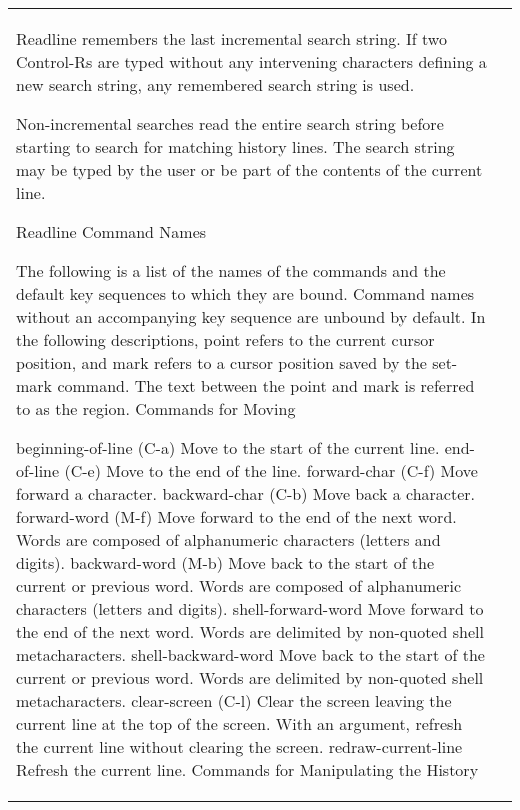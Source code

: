 \documentclass[11pt]{article}
\begin{document}
\begin{longtable}{p{}p{}}
{{{Readline remembers the last incremental search string. If two Control-Rs are typed without any intervening characters defining a new search string, any remembered search string is used.

Non-incremental searches read the entire search string before starting to search for matching history lines. The search string may be typed by the user or be part of the contents of the current line.

Readline Command Names

The following is a list of the names of the commands and the default key sequences to which they are bound. Command names without an accompanying key sequence are unbound by default. In the following descriptions, point refers to the current cursor position, and mark refers to a cursor position saved by the set-mark command. The text between the point and mark is referred to as the region.
Commands for Moving

beginning-of-line (C-a)
Move to the start of the current line.
end-of-line (C-e)
Move to the end of the line.
forward-char (C-f)
Move forward a character.
backward-char (C-b)
Move back a character.
forward-word (M-f)
Move forward to the end of the next word. Words are composed of alphanumeric characters (letters and digits).
backward-word (M-b)
Move back to the start of the current or previous word. Words are composed of alphanumeric characters (letters and digits).
shell-forward-word
Move forward to the end of the next word. Words are delimited by non-quoted shell metacharacters.
shell-backward-word
Move back to the start of the current or previous word. Words are delimited by non-quoted shell metacharacters.
clear-screen (C-l)
Clear the screen leaving the current line at the top of the screen. With an argument, refresh the current line without clearing the screen.
redraw-current-line
Refresh the current line.
Commands for Manipulating the History

}}}
\end{longtable}
\end{document}
